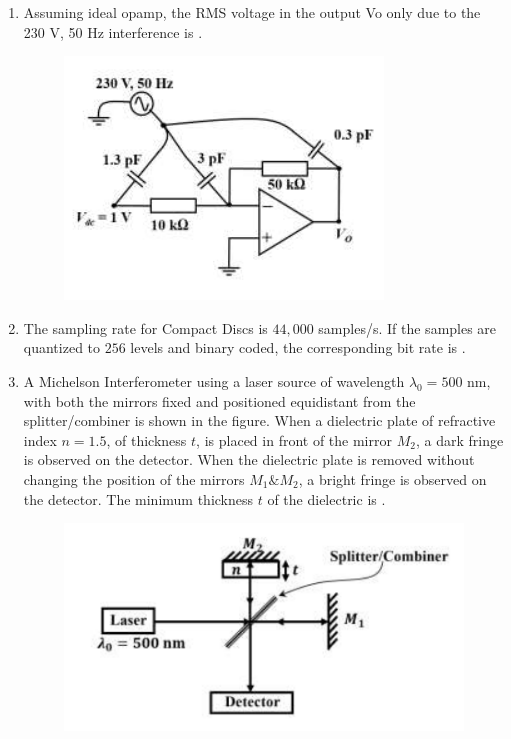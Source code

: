 \documentclass[journal,12pt,onecolumn]{IEEEtran}
\theoremstyle{remark}
\begin{document}
\begin{enumerate}
    \hfill{}

    \item Assuming ideal opamp, the RMS voltage  in the output Vo only due to the 230 V, 50 Hz interference is  \underline{\hspace{2cm}}.
    \begin{figure}[H]
        \centering
        \includegraphics[width=0.5\columnwidth]{q52.png}
        \caption*{}
        \label{fig:q52}
    \end{figure}
    
    \hfill{}

    \item The sampling rate for Compact Discs  is $44,000$ samples/s. If the samples are quantized to $256$ levels and binary coded, the corresponding bit rate  is \underline{\hspace{2cm}}.
    
    \hfill{}

    \item A Michelson Interferometer using a laser source of wavelength $\lambda_0 = 500$ nm, with both the mirrors  fixed and positioned equidistant from the splitter/combiner is shown in the figure. When a dielectric plate of refractive index $n = 1.5$, of thickness $t$, is placed in front of the mirror $M_2$, a dark fringe is observed on the detector. When the dielectric plate is removed without changing the position of the mirrors $M_1\& M_2$, a bright fringe is observed on the detector. The minimum thickness $t$  of the dielectric is \underline{\hspace{2cm}}.
    \begin{figure}[H]
        \centering
        \includegraphics[width=0.5\columnwidth]{q54.png}
        \caption*{}
        \label{fig:q54}
    \end{figure}
    

\end{enumerate}
\end{document}
